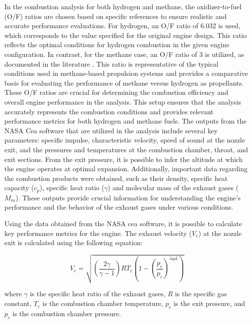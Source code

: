     

In the combustion analysis for both hydrogen and methane, the oxidizer-to-fuel (O/F) ratios are chosen based on specific references to ensure realistic and accurate performance evaluations.
For hydrogen, an O/F ratio of 6.032 \cite{data_sheet} is used, which corresponds to the value specified for the original engine design. 
This ratio reflects the optimal conditions for hydrogen combustion in the given engine configuration. 
In contrast, for the methane case, an O/F ratio of 3 is utilized, as documented in the literature \cite{sutton01}.
This ratio is representative of the typical conditions used in methane-based propulsion systems and provides a comparative basis for evaluating the performance of methane versus hydrogen as propellants.
These O/F ratios are crucial for determining the combustion efficiency and overall engine performance in the analysis.
This setup ensures that the analysis accurately represents the combustion conditions and provides relevant performance metrics for both hydrogen and methane fuels.
The outputs from the NASA \acrshort{Cea} software that are utilized in the analysis include several key parameters: specific impulse, characteristic velocity, speed of sound at the nozzle exit, and the pressures and temperatures at the combustion chamber, throat, and exit sections. 
From the exit pressure, it is possible to infer the altitude at which the engine operates at optimal expansion. Additionally, important data regarding the combustion products were obtained, such as their density, specific heat capacity (\(c_p\)), specific heat ratio (\(\gamma\)) and molecular mass of the exhaust gases (\(M_m\)).
These outputs provide crucial information for understanding the engine's performance and the behavior of the exhaust gases under various conditions.

Using the data obtained from the NASA \acrshort{cea} software, it is possible to calculate key performance metrics for the engine.
The exhaust velocity (\(V_e\)) at the nozzle exit is calculated using the following equation:

\begin{equation}
V_{e} = \sqrt{\left(\frac{2 \gamma}{\gamma - 1}\right) R T_{c} \left(1 - \left(\frac{p_{e}}{p_{c}}\right)^{\frac{\gamma - 1}{\gamma}}\right)}
\end{equation}

where \( \gamma \) is the specific heat ratio of the exhaust gases, \( R\) is the specific gas constant, \( T_{c} \) is the combustion chamber temperature, \( p_{e} \) is the exit pressure, and \( p_{c} \) is the combustion chamber pressure.

